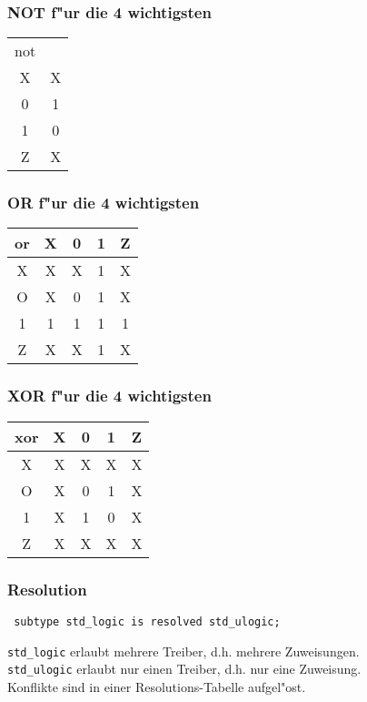 \documentclass[german, 10pt, a4paper, twocolumn]{scrartcl}
\theoremstyle{definition}
\begin{document}
\subsubsection{NOT f"ur die 4 wichtigsten}

\begin{tabular}{c|c}
	not\\
	X &	X\\\hline
	0 &	1\\
	1 &	0\\
	Z &	X
\end{tabular}

\subsubsection{OR f"ur die 4 wichtigsten}

\begin{tabular}{c|cccc}
	or &	X &	0 &	1 &	Z\\\hline
	X &	X &	X &	1 &	X\\
	O &	X &	0 &	1 &	X\\
	1 &	1 &	1 &	1 &	1\\
	Z &	X &	X &	1 &	X
\end{tabular}

\subsubsection{XOR f"ur die 4 wichtigsten}

\begin{tabular}{c|cccc}
	xor &	X &	0 &	1 &	Z\\\hline
	X &	X &	X &	X &	X\\
	O &	X &	0 &	1 &	X\\
	1 &	X &	1 &	0 &	X\\
	Z &	X &	X &	X &	X
\end{tabular}

\subsubsection{Resolution}

\begin{verbatim}
 subtype std_logic is resolved std_ulogic;
\end{verbatim}

\verb#std_logic# erlaubt mehrere Treiber, d.h. mehrere Zuweisungen.\\
\verb#std_ulogic# erlaubt nur einen Treiber, d.h. nur eine Zuweisung.\\
Konflikte sind in einer Resolutions-Tabelle aufgel"ost.\\\\
\end{document}
